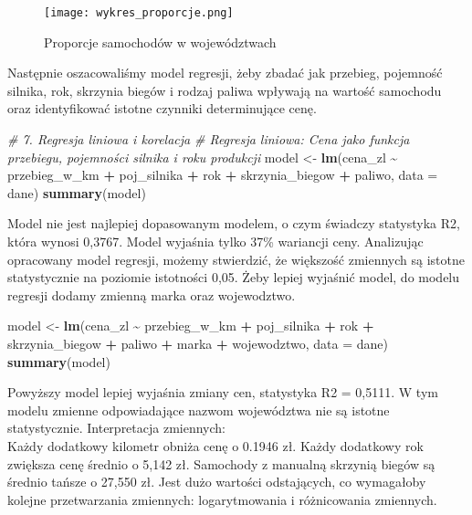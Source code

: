 \documentclass[
]{article}
\newenvironment{Shaded}{\begin{snugshade}}{\end{snugshade}}
\newcommand{\AttributeTok}[1]{\textcolor[rgb]{0.13,0.29,0.53}{#1}}
\newcommand{\CommentTok}[1]{\textcolor[rgb]{0.56,0.35,0.01}{\textit{#1}}}
\newcommand{\FunctionTok}[1]{\textcolor[rgb]{0.13,0.29,0.53}{\textbf{#1}}}
\newcommand{\NormalTok}[1]{#1}
\newcommand{\OtherTok}[1]{\textcolor[rgb]{0.56,0.35,0.01}{#1}}
\newcommand{\SpecialCharTok}[1]{\textcolor[rgb]{0.81,0.36,0.00}{\textbf{#1}}}
\begin{document}
\begin{figure}
\centering
\texttt{[image: wykres\_proporcje.png]}
\caption{Proporcje samochodów w województwach}
\end{figure}

Następnie oszacowaliśmy model regresji, żeby zbadać jak przebieg,
pojemność silnika, rok, skrzynia biegów i rodzaj paliwa wpływają na
wartość samochodu oraz identyfikować istotne czynniki determinujące
cenę.

\begin{Shaded}
\begin{Highlighting}[]
\CommentTok{\# 7. Regresja liniowa i korelacja}
\CommentTok{\# Regresja liniowa: Cena jako funkcja przebiegu, pojemności silnika i roku produkcji}
\NormalTok{model }\OtherTok{\textless{}{-}} \FunctionTok{lm}\NormalTok{(cena\_zl }\SpecialCharTok{\textasciitilde{}}\NormalTok{ przebieg\_w\_km }\SpecialCharTok{+}\NormalTok{ poj\_silnika }\SpecialCharTok{+}\NormalTok{ rok }\SpecialCharTok{+}\NormalTok{ skrzynia\_biegow}
            \SpecialCharTok{+}\NormalTok{ paliwo, }\AttributeTok{data =}\NormalTok{ dane)}
\FunctionTok{summary}\NormalTok{(model)}
\end{Highlighting}
\end{Shaded}

Model nie jest najlepiej dopasowanym modelem, o czym świadczy statystyka
R2, która wynosi 0,3767. Model wyjaśnia tylko 37\% wariancji ceny.
Analizując opracowany model regresji, możemy stwierdzić, że większość
zmiennych są istotne statystycznie na poziomie istotności 0,05. Żeby
lepiej wyjaśnić model, do modelu regresji dodamy zmienną marka oraz
wojewodztwo.

\begin{Shaded}
\begin{Highlighting}[]
\NormalTok{model }\OtherTok{\textless{}{-}} \FunctionTok{lm}\NormalTok{(cena\_zl }\SpecialCharTok{\textasciitilde{}}\NormalTok{ przebieg\_w\_km }\SpecialCharTok{+}\NormalTok{ poj\_silnika }\SpecialCharTok{+}\NormalTok{ rok }\SpecialCharTok{+}\NormalTok{ skrzynia\_biegow}
            \SpecialCharTok{+}\NormalTok{ paliwo }\SpecialCharTok{+}\NormalTok{ marka }\SpecialCharTok{+}\NormalTok{ wojewodztwo, }\AttributeTok{data =}\NormalTok{ dane)}
\FunctionTok{summary}\NormalTok{(model)}
\end{Highlighting}
\end{Shaded}

Powyższy model lepiej wyjaśnia zmiany cen, statystyka R2 = 0,5111. W tym
modelu zmienne odpowiadające nazwom województwa nie są istotne
statystycznie. Interpretacja zmiennych:\\
Każdy dodatkowy kilometr obniża cenę o 0.1946 zł. Każdy dodatkowy rok
zwiększa cenę średnio o 5,142 zł. Samochody z manualną skrzynią biegów
są średnio tańsze o 27,550 zł. Jest dużo wartości odstających, co
wymagałoby kolejne przetwarzania zmiennych: logarytmowania i
różnicowania zmiennych.
\end{document}
